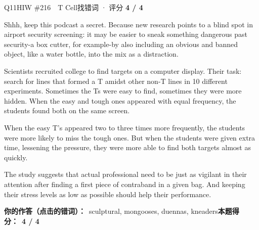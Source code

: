 \begin{qblock}{Q11\quad HIW \#216\ \ T Cell}{找错词 · 评分 \textcolor{cAccent}{\bfseries 4 / 4}}
\begin{promptbox}
Shhh, keep this podcast a secret. Because new research points to a  blind spot in airport security screening: it may be easier to sneak something dangerous past security-a box cutter, for example-by also including an obvious and  banned object, like a water bottle, into the mix as a distraction.

Scientists recruited college  to find targets on a computer display. Their task: search for lines that formed a T amidst other non-T lines in 10 different experiments. Sometimes the Ts were easy to find, sometimes they were more hidden. When the easy and tough ones appeared with equal frequency, the students found both on the same screen.

When the easy T's appeared two to three times more frequently, the students were more likely to miss the tough ones. But when the students were given extra time, lessening the pressure, they were more able to find both targets almost as quickly.

The study suggests that actual professional  need to be just as vigilant in their attention after finding a first piece of contraband in a given bag. And keeping their stress levels as low as possible should help their performance.
\end{promptbox}
\par\smallskip
\textbf{你的作答（点击的错词）：}\ sculptural, mongooses, duennas, kneaders\qquad\textbf{本题得分：}\ {\color{cAccent}\bfseries 4 / 4}
\end{qblock}


